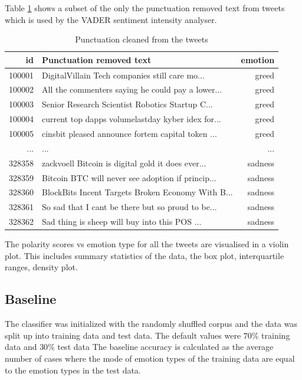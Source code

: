 \documentclass[a4paper, 12pt]{article}
\begin{document}
Table \ref{tab:punctext} shows a subset of the only the punctuation removed text from tweets which is used by the VADER sentiment intensity analyser.
\begin{table}[h]
\begin{center}
    \begin{tabular}{| r | l | r |}
        \hline
        id  				& Punctuation removed text    												&emotion		\\ \hline
        100001       & DigitalVillain Tech companies still care mo...      & greed \\ \hline
        100002       & All the commenters saying he could pay a lower... 	 & greed\\ \hline
        100003       & Senior Research Scientist Robotics Startup C...     & greed \\ \hline
        100004       & current top dapps volumelastday kyber idex for...   & greed  \\ \hline
        100005       & cinsbit pleased announce fortem capital token ...   & greed   \\ \hline
				...     & ...																										& ...	\\ \hline
        328358       & zackvoell Bitcoin is digital gold it does ever...   & sadness    \\ \hline
        328359       & Bitcoin BTC will never see adoption if princip...   & sadness  \\ \hline
        328360       & BlockBits Incent Targets Broken Economy With B...    & sadness   \\ \hline
        328361       & So sad that I cant be there but so proud to be...     & sadness    \\ \hline
        328362      & Sad thing is sheep will buy into this POS 	...      & sadness\\ \hline
    \end{tabular}
    \caption{Punctuation cleaned from the tweets }
    \label{tab:punctext}
\end{center}
\end{table}

The polarity scores vs emotion type for all the tweets are visualised in a violin plot. This includes summary statistics of the data, the box plot, interquartile ranges, density plot.


\subsection{Baseline}
\label{sec:baseline}
The classifier was initialized with the randomly shuffled corpus and the data was split up into training data and test data.
The default values were $70\%$ training data and $30\%$ test data
The baseline accuracy is calculated as the average number of cases where the mode of emotion types of the training data are equal to the emotion types in the test data. 
\end{document}
